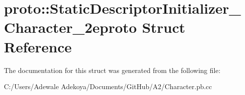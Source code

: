 \hypertarget{structproto_1_1_static_descriptor_initializer___character__2eproto}{}\section{proto\+:\+:Static\+Descriptor\+Initializer\+\_\+\+Character\+\_\+2eproto Struct Reference}
\label{structproto_1_1_static_descriptor_initializer___character__2eproto}


The documentation for this struct was generated from the following file\+:\begin{DoxyCompactItemize}
\item 
C\+:/\+Users/\+Adewale Adekoya/\+Documents/\+Git\+Hub/\+A2/Character.\+pb.\+cc\end{DoxyCompactItemize}
